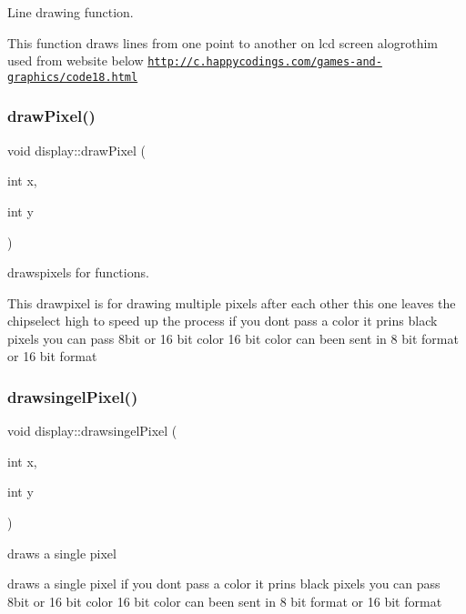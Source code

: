 Line drawing function. 

This function draws lines from one point to another on lcd screen alogrothim used from website below \href{http://c.happycodings.com/games-and-graphics/code18.html}{\tt http\+://c.\+happycodings.\+com/games-\/and-\/graphics/code18.\+html} \mbox{\label{classdisplay_aafdae0e6f1d077e74c362ce0bd3124c9}} 
\subsubsection{\texorpdfstring{draw\+Pixel()}{drawPixel()}}
{\footnotesize\ttfamily void display\+::draw\+Pixel (\begin{DoxyParamCaption}\item[{int}]{x,  }\item[{int}]{y }\end{DoxyParamCaption})}



drawspixels for functions. 

This drawpixel is for drawing multiple pixels after each other this one leaves the chipselect high to speed up the process if you dont pass a color it prins black pixels you can pass 8bit or 16 bit color 16 bit color can been sent in 8 bit format or 16 bit format \mbox{\label{classdisplay_a33c1025dac3f51844cbb2c2cc191ad16}} 
\subsubsection{\texorpdfstring{drawsingel\+Pixel()}{drawsingelPixel()}}
{\footnotesize\ttfamily void display\+::drawsingel\+Pixel (\begin{DoxyParamCaption}\item[{int}]{x,  }\item[{int}]{y }\end{DoxyParamCaption})}



draws a single pixel 

draws a single pixel if you dont pass a color it prins black pixels you can pass 8bit or 16 bit color 16 bit color can been sent in 8 bit format or 16 bit format \mbox{\label{classdisplay_ae33f12ec551d199f3422a581fa40385c}} 

